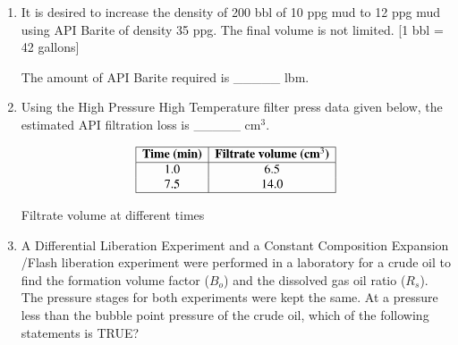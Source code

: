 \documentclass[journal]{IEEEtran}
\begin{document}
\begin{enumerate}
    \item It is desired to increase the density of 200 bbl of 10 ppg mud to 12 ppg mud using API Barite of density 35 ppg. The final volume is not limited.
    [1 bbl = 42 gallons]
    
    The amount of API Barite required is \_\_\_\_\_ lbm.
    
    \hfill{}
    
    \item Using the High Pressure High Temperature  filter press data given below, the estimated API filtration loss is \_\_\_\_\_ cm$^3$.
    
    \begin{table}[h!]
\centering
\[
\begin{array}{|c|c|}
\hline
\textbf{Time (min)} & \textbf{Filtrate volume (cm$^3$)} \\
\hline
1.0 & 6.5 \\
7.5 & 14.0 \\
\hline
\end{array}
\]
\caption{Filtrate volume at different times}
\label{tab:filtrate}
\end{table}

    
    \hfill{}
    
    \item A Differential Liberation Experiment  and a Constant Composition Expansion /Flash liberation experiment were performed in a laboratory for a crude oil to find the formation volume factor ($B_o$) and the dissolved gas oil ratio ($R_s$). The pressure stages for both experiments were kept the same. At a pressure less than the bubble point pressure of the crude oil, which of the following statements is TRUE?
    
    \begin{enumerate}  \end{enumerate}              
    

\end{enumerate}
\end{document}
